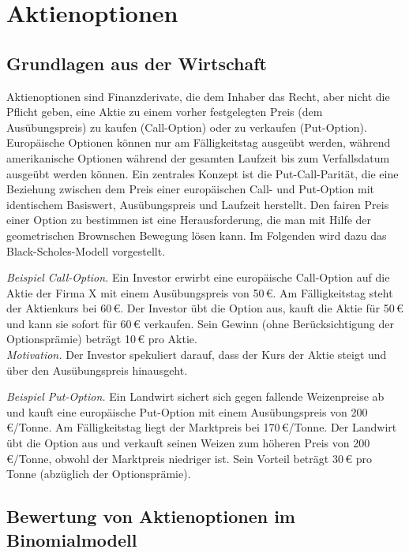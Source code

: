 \section{Aktienoptionen}

\subsection{Grundlagen aus der Wirtschaft}

Aktienoptionen sind Finanzderivate, die dem Inhaber das Recht, aber nicht die Pflicht geben, 
eine Aktie zu einem vorher festgelegten Preis (dem Ausübungspreis) zu kaufen (Call-Option) 
oder zu verkaufen (Put-Option). Europäische Optionen können nur am Fälligkeitstag ausgeübt 
werden, während amerikanische Optionen während der gesamten Laufzeit bis zum Verfallsdatum 
ausgeübt werden können. Ein zentrales Konzept ist die Put-Call-Parität, die eine Beziehung 
zwischen dem Preis einer europäischen Call- und Put-Option mit identischem Basiswert, 
Ausübungspreis und Laufzeit herstellt. Den fairen Preis einer Option zu bestimmen ist eine Herausforderung,
die man mit Hilfe der geometrischen Brownschen Bewegung lösen kann. Im Folgenden wird dazu das Black-Scholes-Modell 
vorgestellt.

\begin{bsp}
\textit{Beispiel Call-Option.} 
Ein Investor erwirbt eine europäische Call-Option auf die Aktie der Firma X mit einem
 Ausübungspreis von 50\,€. Am Fälligkeitstag steht der Aktienkurs bei 60\,€. 
 Der Investor übt die Option aus, kauft die Aktie für 50\,€ und kann 
 sie sofort für 60\,€ verkaufen. Sein Gewinn (ohne Berücksichtigung der Optionsprämie) 
 beträgt 10\,€ pro Aktie.\\
\textit{Motivation.} Der Investor spekuliert darauf, dass der Kurs der Aktie steigt 
und über den Ausübungspreis hinausgeht.

\textit{Beispiel Put-Option.}
Ein Landwirt sichert sich gegen fallende Weizenpreise ab und kauft eine europäische 
Put-Option mit einem Ausübungspreis von 200\,€/Tonne. Am Fälligkeitstag liegt der 
Marktpreis bei 170\,€/Tonne. Der Landwirt übt die Option aus und verkauft seinen 
Weizen zum höheren Preis von 200\,€/Tonne, obwohl der Marktpreis niedriger ist. 
Sein Vorteil beträgt 30\,€ pro Tonne (abzüglich der Optionsprämie).
\end{bsp}

\subsection{Bewertung von Aktienoptionen im Binomialmodell}

